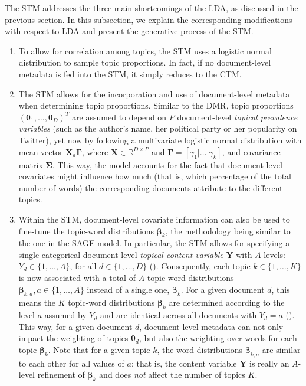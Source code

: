 The STM addresses the three main shortcomings of the LDA, as discussed in the previous section. In this subsection, we explain the corresponding modifications with respect to LDA and present the generative process of the STM.

\begin{enumerate}[label=(\roman*)]
\vspace{-0.25cm}
\item To allow for correlation among topics, the STM uses a logistic normal distribution to sample topic proportions. In fact, if no document-level metadata is fed into the STM, it simply reduces to the CTM.
\vspace{-0.25cm}
\item The STM allows for the incorporation and use of document-level metadata when determining topic proportions. Similar to the DMR, topic proportions $(\boldsymbol{\theta}_1,\dots,\boldsymbol{\theta}_D)^T$ are assumed to depend on $P$ document-level \textit{topical prevalence variables} (such as the author's name, her political party or her popularity on Twitter), yet now by following a multivariate logistic normal distribution with mean vector $\boldsymbol{X}_d\boldsymbol{\Gamma}$, where $\boldsymbol{X} \in \mathbb{R}^{D \times P}$ and $\boldsymbol{\Gamma} = [\gamma_1|\dots|\gamma_k]$, and covariance matrix $\boldsymbol{\Sigma}$. This way, the model accounts for the fact that document-level covariates might influence how much (that is, which percentage of the total number of words) the corresponding documents attribute to the different topics.
\vspace{-0.25cm}
\item Within the STM, document-level covariate information can also be used to fine-tune the topic-word distributions $\boldsymbol{\beta}_k$, the methodology being similar to the one in the SAGE model. In particular, the STM allows for specifying a single categorical document-level \textit{topical content variable} $\boldsymbol{Y}$ with $A$ levels: $Y_d \in \{1,\dots,A\}$, for all $d \in \{1,\dots,D\}$ (\citealp{stm}). Consequently, each topic $k \in \{1,\dots,K\}$ is now associated with a total of $A$ topic-word distributions $\boldsymbol{\beta}_{k,a}, a \in \{1,\dots,A\}$ instead of a single one, $\boldsymbol{\beta}_k$. For a given document $d$, this means the $K$ topic-word distributions $\boldsymbol{\beta}_k$ are determined according to the level $a$ assumed by $Y_d$ and are identical across all documents with $Y_d = a$ (\citealp{roberts2016model}). This way, for a given document $d$, document-level metadata can not only impact the weighting of topics $\boldsymbol{\theta}_d$, but also the weighting over words for each topic $\boldsymbol{\beta}_k$. Note that for a given topic $k$, the word distributions $\boldsymbol{\beta}_{k,a}$ are similar to each other for all values of $a$; that is, the content variable $\boldsymbol{Y}$ is really an $A$-level refinement of $\boldsymbol{\beta}_k$ and does \textit{not} affect the number of topics $K$.

\end{enumerate}

